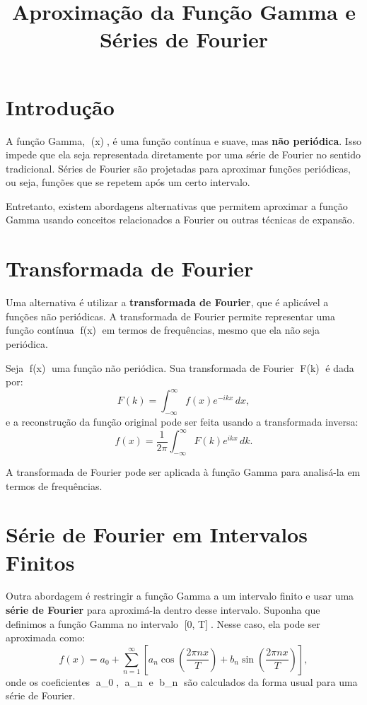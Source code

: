 \documentclass[a4paper,12pt]{article}
\title{Aproximação da Função Gamma e Séries de Fourier}
\author{}
\date{}
\begin{document}
\maketitle

\section*{Introdução}
A função Gamma, \Gamma(x), é uma função contínua e suave, mas \textbf{não periódica}. Isso impede que ela seja representada diretamente por uma série de Fourier no sentido tradicional. Séries de Fourier são projetadas para aproximar funções periódicas, ou seja, funções que se repetem após um certo intervalo.

Entretanto, existem abordagens alternativas que permitem aproximar a função Gamma usando conceitos relacionados a Fourier ou outras técnicas de expansão.

\section*{Transformada de Fourier}
Uma alternativa é utilizar a \textbf{transformada de Fourier}, que é aplicável a funções não periódicas. A transformada de Fourier permite representar uma função contínua f(x) em termos de frequências, mesmo que ela não seja periódica.

Seja f(x) uma função não periódica. Sua transformada de Fourier F(k) é dada por:
\[
F(k) = \int_{-\infty}^{\infty} f(x) e^{-ikx} \, dx,
\]
e a reconstrução da função original pode ser feita usando a transformada inversa:
\[
f(x) = \frac{1}{2\pi} \int_{-\infty}^\infty F(k) e^{ikx} \, dk.
\]

A transformada de Fourier pode ser aplicada à função Gamma para analisá-la em termos de frequências.

\section*{Série de Fourier em Intervalos Finitos}
Outra abordagem é restringir a função Gamma a um intervalo finito e usar uma \textbf{série de Fourier} para aproximá-la dentro desse intervalo. Suponha que definimos a função Gamma no intervalo [0, T]. Nesse caso, ela pode ser aproximada como:
\[
f(x) = a_0 + \sum_{n=1}^\infty \left[ a_n \cos\left(\frac{2\pi n x}{T}\right) + b_n \sin\left(\frac{2\pi n x}{T}\right) \right],
\]
onde os coeficientes a_0, a_n e b_n são calculados da forma usual para uma série de Fourier.
\end{document}
